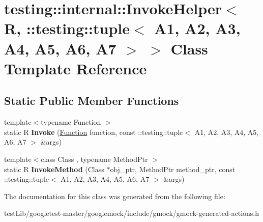 \hypertarget{classtesting_1_1internal_1_1InvokeHelper_3_01R_00_01_1_1testing_1_1tuple_3_01A1_00_01A2_00_01A3_39d55f6ea73f4d04a19cf9b6bab3a605}{}\section{testing\+:\+:internal\+:\+:Invoke\+Helper$<$ R, \+:\+:testing\+:\+:tuple$<$ A1, A2, A3, A4, A5, A6, A7 $>$ $>$ Class Template Reference}
\label{classtesting_1_1internal_1_1InvokeHelper_3_01R_00_01_1_1testing_1_1tuple_3_01A1_00_01A2_00_01A3_39d55f6ea73f4d04a19cf9b6bab3a605}
\subsection*{Static Public Member Functions}
\begin{DoxyCompactItemize}
\item 
\mbox{\label{classtesting_1_1internal_1_1InvokeHelper_3_01R_00_01_1_1testing_1_1tuple_3_01A1_00_01A2_00_01A3_39d55f6ea73f4d04a19cf9b6bab3a605_a8e2485901be5363b29d29198813374b9}} 
{\footnotesize template$<$typename Function $>$ }\\static R {\bfseries Invoke} (\hyperlink{structtesting_1_1internal_1_1Function}{Function} function, const \+::testing\+::tuple$<$ A1, A2, A3, A4, A5, A6, A7 $>$ \&args)
\item 
\mbox{\label{classtesting_1_1internal_1_1InvokeHelper_3_01R_00_01_1_1testing_1_1tuple_3_01A1_00_01A2_00_01A3_39d55f6ea73f4d04a19cf9b6bab3a605_acd27c62b37fa4f9284dccd8827ddd7af}} 
{\footnotesize template$<$class Class , typename Method\+Ptr $>$ }\\static R {\bfseries Invoke\+Method} (Class $\ast$obj\+\_\+ptr, Method\+Ptr method\+\_\+ptr, const \+::testing\+::tuple$<$ A1, A2, A3, A4, A5, A6, A7 $>$ \&args)
\end{DoxyCompactItemize}


The documentation for this class was generated from the following file\+:\begin{DoxyCompactItemize}
\item 
test\+Lib/googletest-\/master/googlemock/include/gmock/gmock-\/generated-\/actions.\+h\end{DoxyCompactItemize}
